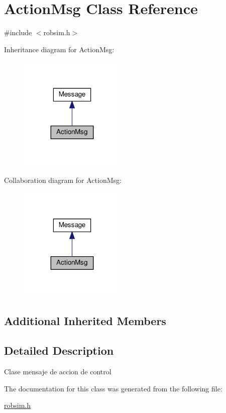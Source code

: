 \hypertarget{class_action_msg}{}\section{Action\+Msg Class Reference}
\label{class_action_msg}


{\ttfamily \#include $<$robsim.\+h$>$}



Inheritance diagram for Action\+Msg\+:
\nopagebreak
\begin{figure}[H]
\begin{center}
\leavevmode
\includegraphics[width=143pt]{class_action_msg__inherit__graph}
\end{center}
\end{figure}


Collaboration diagram for Action\+Msg\+:
\nopagebreak
\begin{figure}[H]
\begin{center}
\leavevmode
\includegraphics[width=143pt]{class_action_msg__coll__graph}
\end{center}
\end{figure}
\subsection*{Additional Inherited Members}


\subsection{Detailed Description}
Clase mensaje de accion de control 

The documentation for this class was generated from the following file\+:\begin{DoxyCompactItemize}
\item 
\hyperlink{robsim_8h}{robsim.\+h}\end{DoxyCompactItemize}
